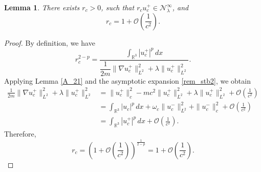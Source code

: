 \documentclass{amsart}
\theoremstyle{plain}
\newtheorem{lemma}[theorem]{Lemma}
\theoremstyle{definition}
\theoremstyle{remark}
\numberwithin{equation}{section} \numberwithin{figure}{section}
\begin{document}
\begin{lemma}\label{A_3}
    There exists $r_c >0$, such that $r_c u_c^+ \in \mathcal{N}^\infty_\lambda$, and $$r_c = 1 + \mathcal{O}\left(\frac{1}{c^2}\right).$$
\end{lemma}
\begin{proof}
  By definition, we have
  \begin{equation}
      r_c^{2-p} = \frac{\int_{\mathbb{R}^3} |u_c^+|^p \, dx}{\dfrac{1}{2m} \|\nabla u_c^+\|_{L^2}^2 + \lambda \|u_c^+\|_{L^2}^2}.
  \end{equation}
  Applying Lemma \ref{A_21} and the asymptotic expansion \eqref{rem_stb2},
  we obtain
  \begin{equation*}
      \begin{split}
          \frac{1}{2m} \|\nabla u_c^+\|_{L^2}^2 + \lambda \|u_c^+\|_{L^2}^2 
          &= \|u_c^+\|_c^2 - mc^2 \|u_c^+\|_{L^2}^2 + \lambda \|u_c^+\|_{L^2}^2 + \mathcal{O}\left(\frac{1}{c^2}\right) \\
          &= \int_{\mathbb{R}^3} |u_c|^p \, dx + \omega_c \|u_c^-\|_{L^2}^2 + \|u_c^-\|_c^2 + \mathcal{O}\left(\frac{1}{c^2}\right) \\
          &= \int_{\mathbb{R}^3} |u_c^+|^p \, dx + \mathcal{O}\left(\frac{1}{c^2}\right).
      \end{split}
  \end{equation*}
  Therefore,
  \[
      r_c = \left(1 + \mathcal{O}\left(\frac{1}{c^2}\right)\right)^{\frac{1}{2-p}} = 1 + \mathcal{O}\left(\frac{1}{c^2}\right).
  \]
\end{proof}
\end{document}
